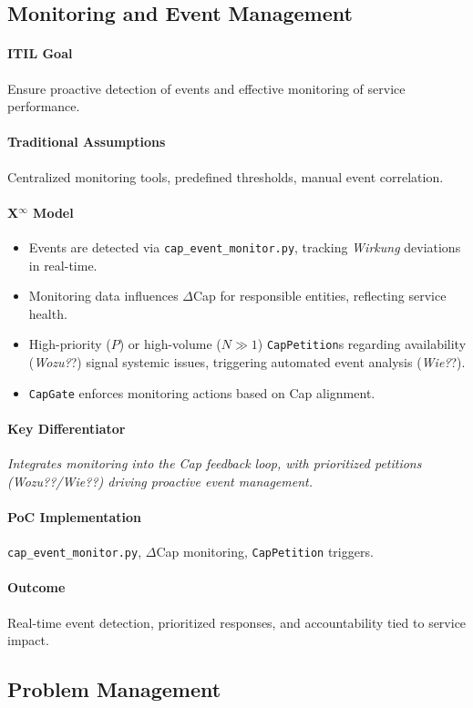 \documentclass[12pt, a4paper]{scrartcl}
\newcommand{\Xinf}{X$^\infty$}                        %
\newcommand{\DeltaCap}{$\Delta$Cap}                    %
\newcommand{\Wirkung}{\textit{Wirkung}}                 %
\newcommand{\CapGate}{\texttt{CapGate}}
\newcommand{\CapPetition}{\texttt{CapPetition}}        %
\newcommand{\Wozu}{\textit{Wozu?}}                      %
\newcommand{\Wie}{\textit{Wie?}}                        %
\begin{document}
\subsection{Monitoring and Event Management} %
\paragraph{ITIL Goal} Ensure proactive detection of events and effective monitoring of service performance.
\paragraph{Traditional Assumptions} Centralized monitoring tools, predefined thresholds, manual event correlation.
\paragraph*{\Xinf{} Model}
\begin{itemize}
    \item Events are detected via \texttt{cap\_event\_monitor.py}, tracking \Wirkung{} deviations in real-time.
    \item Monitoring data influences \DeltaCap{} for responsible entities, reflecting service health.
    \item High-priority ($P$) or high-volume ($N \gg 1$) \CapPetition{}s regarding availability (\Wozu?) signal systemic issues, triggering automated event analysis (\Wie?).
    \item \CapGate{} enforces monitoring actions based on Cap alignment.
\end{itemize}
\paragraph{Key Differentiator} \textit{Integrates monitoring into the Cap feedback loop, with prioritized petitions (\Wozu?/\Wie?) driving proactive event management.}
\paragraph{PoC Implementation} \texttt{cap\_event\_monitor.py}, \DeltaCap{} monitoring, \CapPetition{} triggers.
\paragraph{Outcome} Real-time event detection, prioritized responses, and accountability tied to service impact.

\subsection{Problem Management} %
\end{document}
